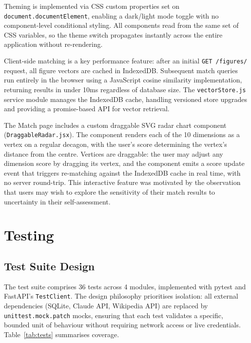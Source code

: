 \documentclass[11pt, a4paper]{report}
\begin{document}
Theming is implemented via CSS custom properties set on \texttt{document.documentElement}, enabling a dark/light mode toggle with no component-level conditional styling. All components read from the same set of CSS variables, so the theme switch propagates instantly across the entire application without re-rendering.

Client-side matching is a key performance feature: after an initial \texttt{GET /figures/} request, all figure vectors are cached in IndexedDB. Subsequent match queries run entirely in the browser using a JavaScript cosine similarity implementation, returning results in under 10ms regardless of database size. The \texttt{vectorStore.js} service module manages the IndexedDB cache, handling versioned store upgrades and providing a promise-based API for vector retrieval.

The Match page includes a custom draggable SVG radar chart component (\texttt{DraggableRadar.jsx}). The component renders each of the 10 dimensions as a vertex on a regular decagon, with the user's score determining the vertex's distance from the centre. Vertices are draggable: the user may adjust any dimension score by dragging its vertex, and the component emits a score update event that triggers re-matching against the IndexedDB cache in real time, with no server round-trip. This interactive feature was motivated by the observation that users may wish to explore the sensitivity of their match results to uncertainty in their self-assessment.

\section{Testing}

\subsection{Test Suite Design}

The test suite comprises 36 tests across 4 modules, implemented with pytest and FastAPI's \texttt{TestClient}. The design philosophy prioritises isolation: all external dependencies (SQLite, Claude API, Wikipedia API) are replaced by \texttt{unittest.mock.patch} mocks, ensuring that each test validates a specific, bounded unit of behaviour without requiring network access or live credentials. Table~\ref{tab:tests} summarises coverage.
\end{document}
